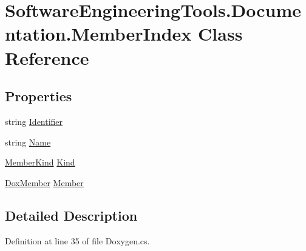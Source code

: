 \hypertarget{class_software_engineering_tools_1_1_documentation_1_1_member_index}{\section{Software\+Engineering\+Tools.\+Documentation.\+Member\+Index Class Reference}
\label{class_software_engineering_tools_1_1_documentation_1_1_member_index}
}
\subsection*{Properties}
\begin{DoxyCompactItemize}
\item 
string \hyperlink{class_software_engineering_tools_1_1_documentation_1_1_member_index_a2fc3f24b9bc668135899d3de039c6192}{Identifier}
\item 
string \hyperlink{class_software_engineering_tools_1_1_documentation_1_1_member_index_a3c095e56c2e89f60e037a1a07dcf1932}{Name}
\item 
\hyperlink{namespace_software_engineering_tools_1_1_documentation_aaff72777d8ab337bb7e1d0e3727171b3}{Member\+Kind} \hyperlink{class_software_engineering_tools_1_1_documentation_1_1_member_index_a2964ceaf87097d830c1f78298248f7e9}{Kind}
\item 
\hyperlink{class_software_engineering_tools_1_1_documentation_1_1_dox_member}{Dox\+Member} \hyperlink{class_software_engineering_tools_1_1_documentation_1_1_member_index_a66c8c8c244a1e6f2ca7982f1390b780f}{Member}
\end{DoxyCompactItemize}


\subsection{Detailed Description}


Definition at line 35 of file Doxygen.\+cs.



